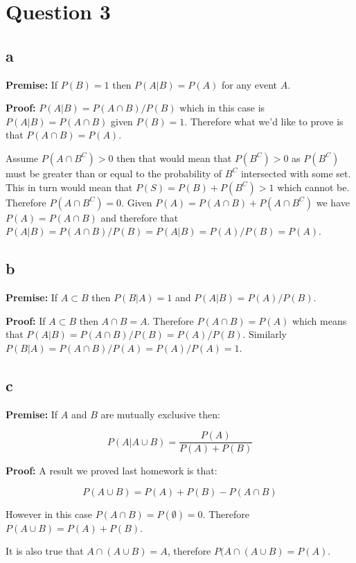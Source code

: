 \documentclass[11pt]{article}
\begin{document}
\section{Question 3}

\subsection{a}

\textbf{Premise:} If $P(B)=1$ then $P(A|B)=P(A)$ for any event $A$. \newline

\textbf{Proof:} $P(A|B)=P(A \cap B)/P(B)$ which in this case is $ P(A|B)=P(A \cap B)$ given $P(B)=1$. Therefore what we'd like to prove is that $P(A \cap B) = P(A)$. 


Assume $P(A\cap B^C)> 0$ then that would mean that $P(B^C) > 0$ as $P(B^C)$ must be greater than or equal to the probability of $B^C$ intersected with some set. This in turn would mean that $P(S) = P(B)+P(B^C)>1$ which cannot be. Therefore $P(A\cap B^C)=0$. Given $P(A)=P(A \cap B) + P(A \cap B^C)$ we have $P(A)=P(A \cap B)$ and therefore that $P(A|B)=P(A \cap B)/P(B)=P(A|B)=P(A)/P(B)=P(A)$. 


\subsection{b}


\textbf{Premise:} If $A \subset B$ then $P(B|A) = 1$ and $P(A|B) = P(A)/P(B)$. \newline

\textbf{Proof:} If $A \subset B$ then $A \cap B = A$. Therefore $P(A \cap B) = P(A)$ which means that $P(A|B)=P(A \cap B)/P(B)=P(A)/P(B)$. Similarly $P(B|A)=P(A \cap B)/P(A) = P(A)/P(A)=1$. 

\subsection{c}

\textbf{Premise:} If $A$ and $B$ are mutually exclusive then:

$$P(A|A \cup B)= \frac{P(A)}{P(A) + P(B)}$$

\textbf{Proof:} A result we proved last homework is that:

$$P(A \cup B) = P(A) + P(B) - P(A \cap B)$$

However in this case $P(A \cap B)=P(\emptyset)=0$. Therefore $P(A \cup B) = P(A) + P(B)$. 

It is also true that $A \cap (A \cup B) = A$, therefore $P(A \cap (A \cup B)=P(A)$. 
\end{document}
